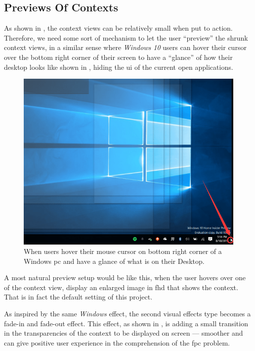 \subsection{Previews Of Contexts}


As shown in , the context views can be relatively small when put to action. Therefore, we need some sort of mechanism to let the user ``preview'' the shrunk context views, in a similar sense where \emph{Windows 10} users can hover their cursor over the bottom right corner of their screen to have a ``glance'' of how their desktop looks like shown in , hiding the \gls{ui} of the current open applications.

\begin{figure}[H]
\centering
\includegraphics[width=\textwidth,keepaspectratio]{Figures/Chapter1/winpreview.png}
\decoRule
\caption[``Preview'' Mechanism on Windows 10]{When users hover their mouse cursor on bottom right corner of a Windows \gls{pc} and have a glance of what is on their Desktop.}
\label{fig:winpreview}
\end{figure}

A most natural preview setup would be like this, when the user hovers over one of the context view, display an enlarged image in \gls{fhd} that shows the context. That is in fact the default setting of this project.

As inspired by the same \emph{Windows} effect, the second visual effects type becomes a fade-in and fade-out effect. This effect, as shown in , is adding a small transition in the transparencies of the context to be displayed on screen --- smoother and can give positive user experience in the comprehension of the \gls{fpc} problem.

